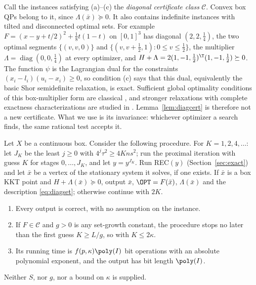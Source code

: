 \begin{remark}\label{rem:shor}
Call the instances satisfying (a)--(c) the \emph{diagonal certificate class}
$\mathcal C$. Convex box QPs belong to it, since $\Lambda(\bar x)\succeq0$. It also contains indefinite instances with tilted and
disconnected optimal sets. For example $F=(x-y+t/2)^2+\frac18t(1-t)$ on
$[0,1]^3$ has diagonal $(2,2,\frac14)$, the two optimal segments
$\{(v,v,0)\}$ and $\{(v,v+\frac12,1):0\le v\le\frac12\}$, the multiplier
$\Lambda=\operatorname{diag}(0,0,\frac14)$ at every optimizer, and
$H+\Lambda=2(1,-1,\tfrac12)^{\T}(1,-1,\tfrac12)\succeq0$. The function
$\psi$ is the Lagrangian dual for the constraints
$(x_i-l_i)(u_i-x_i)\ge0$, so condition (c) says that this dual, equivalently
the basic Shor semidefinite relaxation, is exact. Sufficient global
optimality conditions of this box-multiplier form are classical
\cite{JeyakumarRubinovWu2006,LiWuQuan2015}, and stronger relaxations with
complete exactness characterizations are studied in \cite{QiuYildirim2024}.
Lemma~\ref{lem:diagcert} is therefore not a new certificate. What we use is
its invariance: whichever optimizer a search finds, the same rational test
accepts it.
\end{remark}



\begin{theorem}\label{thm:diagdiscovery}
Let $X$ be a continuous box. Consider the following procedure. For
$K=1,2,4,\ldots$: let $J_K$ be the least $j\ge0$ with $4^j\tau^2\ge4Kns^2$;
run the proximal iteration with guess $K$ for stages $0,\ldots,J_K$, and let
$y=y^{J_K}$. Run REC$(y)$ (Section~\ref{sec:exact}) and let $\bar x$ be a vertex of the
stationary system it solves, if one exists. If $\bar x$ is a box KKT point and
$H+\Lambda(\bar x)\succeq0$, output $\bar x$, $\OPT=F(\bar x)$, $\Lambda(\bar x)$
and the description \eqref{eq:diagset}; otherwise continue with $2K$.
\begin{enumerate}
\item[(a)] Every output is correct, with no assumption on the instance.
\item[(b)] If $F\in\mathcal C$ and $g>0$ is any set-growth constant, the
procedure stops no later than the first guess $K\ge L/g$, so with $K\le2\kappa$.
\item[(c)] Its running time is $f(p,\kappa)\poly(I)$ bit operations with an
absolute polynomial exponent, and the output has bit length $\poly(I)$.
\end{enumerate}
Neither $S$, nor $g$, nor a bound on $\kappa$ is supplied.
\end{theorem}

